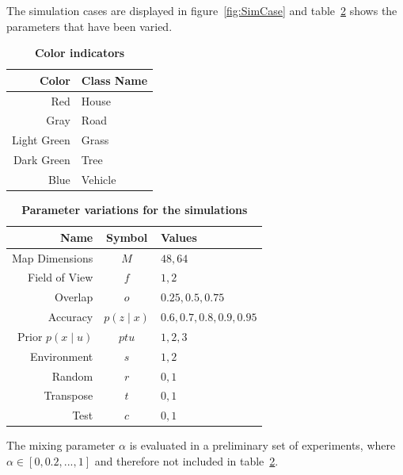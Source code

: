 \documentclass[twocolumn,letterpaper]{IEEEAerospaceCLS}  %
\begin{document}
The simulation cases are displayed in figure~\ref{fig:SimCase} and table~\ref{tab:params} shows the parameters that have been varied.
\begin{table}[]
    \renewcommand{\arraystretch}{1.3}
    \caption{\bf Color indicators}
    \label{tab:colors}
    \centering
    \begin{tabular}{|r||l|}
        \hline
        \bfseries Color      & \bfseries Class Name    \\
        \hline \hline
        Red &  House\\
        \hline
        Gray  & Road         \\
        \hline
        Light Green     & Grass              \\
        \hline
        Dark Green & Tree           \\
        \hline
        Blue & Vehicle \\
        \hline
    \end{tabular}
\end{table}
\begin{table}[]
    \renewcommand{\arraystretch}{1.3}
    \caption{\bf Parameter variations for the simulations}
    \label{tab:params}
    \centering
    \begin{tabular}{|r||c|l|}
        \hline
        \bfseries Name      & \bfseries Symbol & \bfseries Values       \\
        \hline \hline
        Map Dimensions & $M$ & $48, 64$\\
        \hline
        Field of View  & $f$              & $1, 2$ \\
        \hline
        Overlap     & $o$              & $0.25, 0.5, 0.75$         \\
        \hline
        Accuracy & $p(z\mid x)$              & $0.6, 0.7, 0.8, 0.9, 0.95$        \\
        \hline
        Prior $p(x\mid u)$ & $ptu$ & $1, 2, 3$ \\
        \hline
        Environment & $s$ & $1, 2$ \\
        \hline
        Random & $r$ & $0, 1$ \\
        \hline
        Transpose & $t$ & $0, 1$  \\
        \hline
        Test & $c$ & $0, 1$  \\
        \hline
    \end{tabular}
\end{table}
The mixing parameter $\alpha$ is evaluated in a preliminary set of experiments, where $\alpha \in [0, 0.2, ..., 1]$ and therefore not included in table~\ref{tab:params}.
\end{document}
